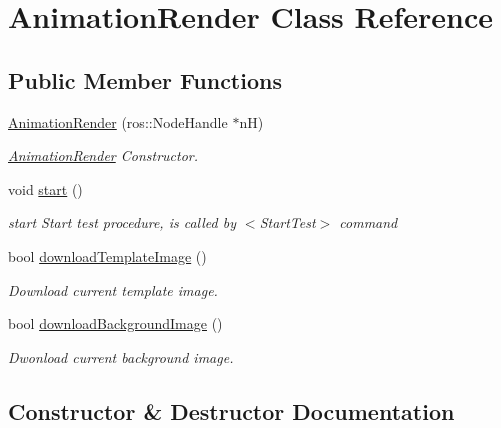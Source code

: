 \hypertarget{classAnimationRender}{}\section{Animation\+Render Class Reference}
\label{classAnimationRender}
\subsection*{Public Member Functions}
\begin{DoxyCompactItemize}
\item 
\hyperlink{classAnimationRender_add45175c946790a10451ba9cdb5caa37}{Animation\+Render} (ros\+::\+Node\+Handle $\ast$nH)
\begin{DoxyCompactList}\small\item\em \hyperlink{classAnimationRender}{Animation\+Render} Constructor. \end{DoxyCompactList}\item 
void \hyperlink{classAnimationRender_a5badc5fbb7d9c2ce6f4f9b6dda610615}{start} ()\hypertarget{classAnimationRender_a5badc5fbb7d9c2ce6f4f9b6dda610615}{}\label{classAnimationRender_a5badc5fbb7d9c2ce6f4f9b6dda610615}

\begin{DoxyCompactList}\small\item\em start Start test procedure, is called by $<$\+Start\+Test$>$ command \end{DoxyCompactList}\item 
bool \hyperlink{classAnimationRender_ae21bd75361e818fd3c10c4b9a3def277}{download\+Template\+Image} ()
\begin{DoxyCompactList}\small\item\em Download current template image. \end{DoxyCompactList}\item 
bool \hyperlink{classAnimationRender_a2b6e770e27bb976e31e19a948fcce3af}{download\+Background\+Image} ()
\begin{DoxyCompactList}\small\item\em Dwonload current background image. \end{DoxyCompactList}\end{DoxyCompactItemize}


\subsection{Constructor \& Destructor Documentation}
